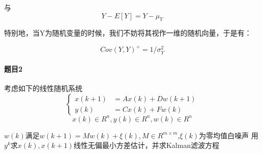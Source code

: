 \documentclass[12pt, a4paper]{ctexart}
\begin{document}
与
\[
    Y-E[Y]=Y-\mu_Y
\]

特别地，当Y为随机变量的时候，我们不妨将其视作一维的随机向量，于是有：

\[
    Cov(Y,Y)^+ = 1/\sigma_Y^2
\]


\paragraph{题目2}
考虑如下的线性随机系统
	\[
	\left\{\begin{array}{rl}
		x(k+1)&=Ax(k)+Dw(k+1)\\
		y(k)&=Cx(k)+Fw(k)
		\end{array}\right.
	\]
	\[
		x(k)\in R^n,y(k)\in R^n,w(k)\in R^n
	\]

	$w(k)$满足$w(k+1)=Mw(k)+\xi(k),M\in R^{m\times m}$,$\xi(k)$为零均值白噪声
    用$y^k$求$x(k),x(k+1)$线性无偏最小方差估计，并求Kalman滤波方程
    
\end{document}
